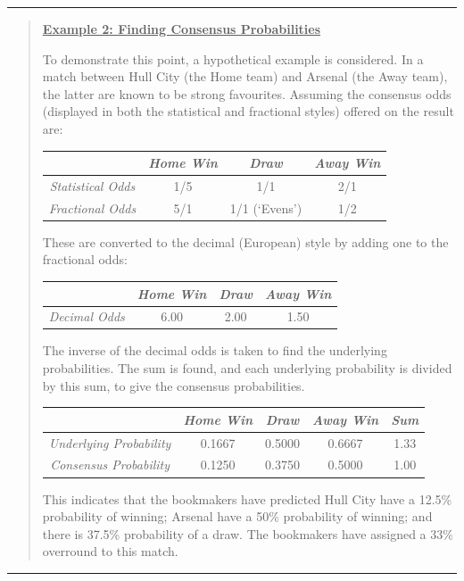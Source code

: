 \documentclass[a4paper,10pt]{report}
\begin{document}
\begin{center}\rule{0.75\textwidth}{0.6pt}\end{center}
\begin{quote}
	\begin{center}\textbf{\underline{Example 2: Finding Consensus Probabilities}}\end{center}
	To demonstrate this point, a hypothetical example is considered. In a match between Hull City (the Home team) and Arsenal (the Away team), the latter are known to be strong favourites. Assuming the consensus odds (displayed in both the statistical and fractional styles) offered on the result are:
	
	\begin{center}\begin{tabular}{c|ccc}
			& \textit{Home Win} 	& \textit{Draw} 			& \textit{Away Win} \\ \hline
			\textit{Statistical Odds} 	& 1/5		& 1/1 			& 2/1 \\
			\textit{Fractional Odds}		& 5/1 		& 1/1 (`Evens') 	& 1/2 \\
	\end{tabular}\end{center}
	
	These are converted to the decimal (European) style by adding one to the fractional odds:
	
	\begin{center}\begin{tabular}{c|ccc}
			& \textit{Home Win} 	& \textit{Draw} 			& \textit{Away Win} \\ \hline
			\textit{Decimal Odds}	& 6.00 		& 2.00 			& 1.50 \\
	\end{tabular}\end{center}
	
	The inverse of the decimal odds is taken to find the underlying probabilities. The sum is found, and each underlying probability is divided by this sum, to give the consensus probabilities.
	
	\begin{center}\begin{tabular}{c|ccc|c}
			& \textit{Home Win}	& \textit{Draw}	& \textit{Away Win} 	& \textit{Sum} \\ \hline
			\textit{Underlying Probability}	& 0.1667 	& 0.5000& 0.6667	& 1.33 \\
			\textit{Consensus Probability}	& 0.1250	& 0.3750& 0.5000	& 1.00
	\end{tabular}\end{center}
	
	This indicates that the bookmakers have predicted Hull City have a 12.5\% probability of winning; Arsenal have a 50\% probability of winning; and there is 37.5\% probability of a draw. The bookmakers have assigned a 33\% overround to this match. 
\end{quote}
\begin{center}\rule{0.75\textwidth}{0.6pt}\end{center}
\end{document}
